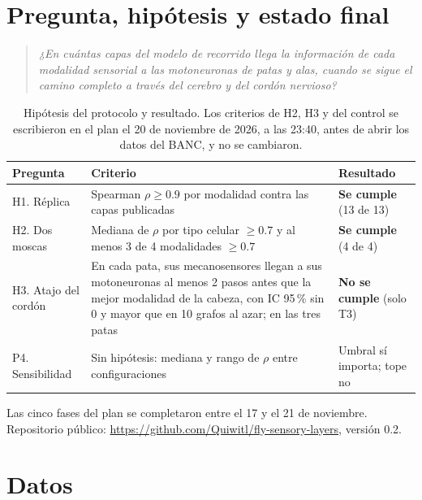 \documentclass[11pt,letterpaper]{article}
\begin{document}
\section{Pregunta, hipótesis y estado final}

\begin{quote}
\emph{¿En cuántas capas del modelo de recorrido llega la información de cada modalidad sensorial a las motoneuronas de patas y alas, cuando se sigue el camino completo a través del cerebro y del cordón nervioso?}
\end{quote}

\begin{table}[H]
\centering
\small
\begin{tabularx}{\linewidth}{@{}p{2.9cm}Lp{3.2cm}@{}}
\toprule
\textbf{Pregunta} & \textbf{Criterio} & \textbf{Resultado} \\
\midrule
H1. Réplica & Spearman $\rho \ge 0.9$ por modalidad contra las capas publicadas & \textbf{Se cumple} (13 de 13) \\
H2. Dos moscas & Mediana de $\rho$ por tipo celular $\ge 0.7$ y al menos 3 de 4 modalidades $\ge 0.7$ & \textbf{Se cumple} (4 de 4) \\
H3. Atajo del cordón & En cada pata, sus mecanosensores llegan a sus motoneuronas al menos 2 pasos antes que la mejor modalidad de la cabeza, con IC 95\,\% sin 0 y mayor que en 10 grafos al azar; en las tres patas & \textbf{No se cumple} (solo T3) \\
P4. Sensibilidad & Sin hipótesis: mediana y rango de $\rho$ entre configuraciones & Umbral sí importa; tope no \\
\bottomrule
\end{tabularx}
\caption{Hipótesis del protocolo y resultado. Los criterios de H2, H3 y del control se escribieron en el plan el 20 de noviembre de 2026, a las 23:40, antes de abrir los datos del BANC, y no se cambiaron.}
\label{tab:estado}
\end{table}

\noindent Las cinco fases del plan se completaron entre el 17 y el 21 de noviembre. Repositorio público: \url{https://github.com/Quiwitl/fly-sensory-layers}, versión 0.2.

\section{Datos}
\end{document}
